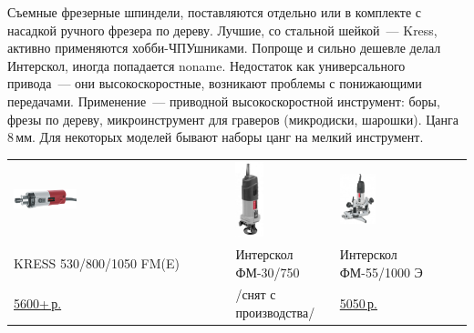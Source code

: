 Съемные фрезерные шпиндели, поставляются отдельно или в комплекте с насадкой
ручного фрезера по дереву. Лучшие, со стальной шейкой\ --- Kress, активно
применяются хобби-ЧПУшниками. Попроще и сильно дешевле делал Интерскол, иногда
попадается noname. Недостаток как универсального привода\ --- они
высокоскоростные, возникают проблемы с понижающими передачами. Применение\ ---
приводной высокоскоростной инструмент: боры, фрезы по дереву, микроинструмент
для граверов (микродиски, шарошки). Цанга 8\,мм. Для некоторых моделей бывают
наборы цанг на мелкий инструмент.

\bigskip
\begin{tabular}{p{} p{} p{} }
\noindent\includegraphics[height=0.3\textheight,width=0.3\textwidth,keepaspectratio]{tech/tools/Kress530.jpg}
&
\noindent\includegraphics[height=0.3\textheight,width=0.3\textwidth,keepaspectratio]{tech/tools/Interskol30.jpg}
&
\noindent\includegraphics[height=0.3\textheight,width=0.3\textwidth,keepaspectratio]{tech/tools/InterskolFM55.jpg}
\\
KRESS 530/800/1050 FM(E)
&
Интерскол ФМ-30/750
&
Интерскол ФМ-55/1000 Э
\\
\href{http://kress-shop.ru/product/frezernyj-dvigatel-530-fm-kress-06082302/}{5600+\,р.}
&
/снят с производства/
&
\href{http://www.kuvalda.ru/catalog/1867/27920/}{5050\,р.}
\\
\end{tabular}
